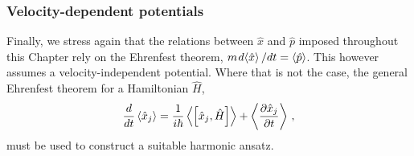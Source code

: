\subsubsection{Velocity-dependent potentials}

Finally, we stress again that the relations between $\hat{x}$ and $\hat{p}$ imposed throughout this Chapter rely on the Ehrenfest theorem, $m \hspace*{0.3mm} d \hspace*{-0.6mm} \expval{\hat{x}} / dt = \expval{\hat{p}}$. This however assumes a velocity-independent potential. Where that is not the case, the general Ehrenfest theorem for a Hamiltonian $\hat{H}$,
\begin{equation}
\frac{d }{dt} \expval{\hat{x}_j}= \frac{1}{i \hbar} \expval{\left[\hat{x}_j, \hat{H} \right]} + \expval{\frac{\partial \hat{x}_j}{\partial t}}\,,
\end{equation}
must be used to construct a suitable harmonic ansatz. 